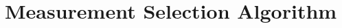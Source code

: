 \documentclass{article}
\begin{document}



\section{Measurement Selection Algorithm}
\end{document}
